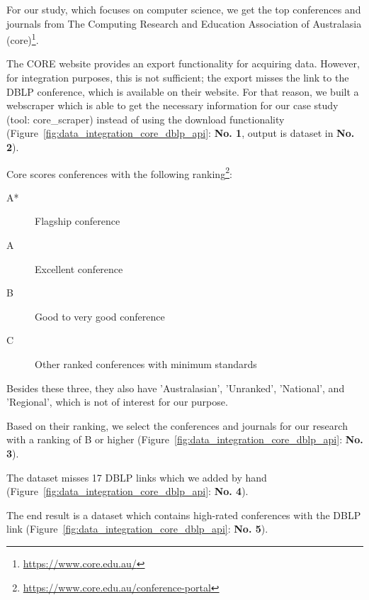 \documentclass{ou-report}
\newcommand{\dblp}{DBLP}
\newcommand{\api}{API}
\begin{document}
For our study, which focuses on computer science, we get the top conferences 
and journals from The Computing Research and Education Association of 
Australasia (core)\footnote{\url{https://www.core.edu.au/}}.


The CORE website provides an export functionality for acquiring data. However, 
for integration purposes, this is not sufficient; the export misses the link to 
the DBLP conference, which is available on their website. For that reason, we 
built a webscraper which is able to get the necessary information for our case 
study (tool: core\_scraper) instead of using the download functionality
(Figure~\ref{fig:data_integration_core_dblp_api}: \textbf{No. 1}, output is 
dataset in \textbf{No. 2}).

Core scores conferences with the following
ranking\footnote{\url{https://www.core.edu.au/conference-portal}}:
\begin{description}
    \item[A*] Flagship conference
    \item[A] Excellent conference
    \item[B] Good to very good conference
    \item[C] Other ranked conferences with minimum standards
\end{description}
Besides these three, they also have 'Australasian', 'Unranked', 'National', and 
'Regional', which is not of interest for our purpose.

Based on their ranking, we select the conferences and journals for our 
research with a ranking of B or higher 
(Figure~\ref{fig:data_integration_core_dblp_api}: \textbf{No. 3}).

The dataset misses 17 DBLP links which we added by hand 
(Figure~\ref{fig:data_integration_core_dblp_api}: \textbf{No. 4}).

The end result is a dataset which contains high-rated conferences with the
DBLP link (Figure~\ref{fig:data_integration_core_dblp_api}: \textbf{No. 5}).
\end{document}
